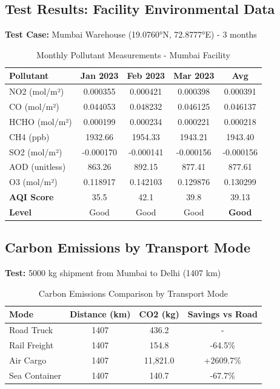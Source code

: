 \documentclass[11pt,a4paper]{article}
\begin{document}
\subsection{Test Results: Facility Environmental Data}

\textbf{Test Case:} Mumbai Warehouse (19.0760°N, 72.8777°E) - 3 months

\begin{table}[H]
\centering
\small
\begin{tabular}{|l|c|c|c|c|}
\hline
\textbf{Pollutant} & \textbf{Jan 2023} & \textbf{Feb 2023} & \textbf{Mar 2023} & \textbf{Avg} \\
\hline
NO2 (mol/m²) & 0.000355 & 0.000421 & 0.000398 & 0.000391 \\
CO (mol/m²) & 0.044053 & 0.048232 & 0.046125 & 0.046137 \\
HCHO (mol/m²) & 0.000199 & 0.000234 & 0.000221 & 0.000218 \\
CH4 (ppb) & 1932.66 & 1954.33 & 1943.21 & 1943.40 \\
SO2 (mol/m²) & -0.000170 & -0.000141 & -0.000156 & -0.000156 \\
AOD (unitless) & 863.26 & 892.15 & 877.41 & 877.61 \\
O3 (mol/m²) & 0.118917 & 0.142103 & 0.129876 & 0.130299 \\
\hline
\rowcolor{gray!20}
\textbf{AQI Score} & 35.5 & 42.1 & 39.8 & 39.13 \\
\rowcolor{gray!20}
\textbf{Level} & Good & Good & Good & \textbf{Good} \\
\hline
\end{tabular}
\caption{Monthly Pollutant Measurements - Mumbai Facility}
\end{table}

\subsection{Carbon Emissions by Transport Mode}

\textbf{Test:} 5000 kg shipment from Mumbai to Delhi (1407 km)

\begin{table}[H]
\centering
\begin{tabular}{|l|c|c|c|}
\hline
\textbf{Mode} & \textbf{Distance (km)} & \textbf{CO2 (kg)} & \textbf{Savings vs Road} \\
\hline
Road Truck & 1407 & 436.2 & - \\
Rail Freight & 1407 & 154.8 & -64.5\% \\
Air Cargo & 1407 & 11,821.0 & +2609.7\% \\
Sea Container & 1407 & 140.7 & -67.7\% \\
\hline
\end{tabular}
\caption{Carbon Emissions Comparison by Transport Mode}
\end{table}
\end{document}
